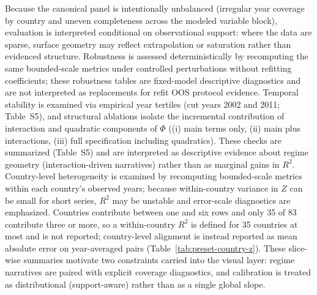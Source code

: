 \documentclass[11pt]{article}
\begin{document}
Because the canonical panel is intentionally unbalanced (irregular year coverage by country and uneven completeness across the modeled variable block), evaluation is interpreted conditional on observational support: where the data are sparse, surface geometry may reflect extrapolation or saturation rather than evidenced structure. Robustness is assessed deterministically by recomputing the same bounded-scale metrics under controlled perturbations without refitting coefficients; these robustness tables are fixed-model descriptive diagnostics and are not interpreted as replacements for refit OOS protocol evidence. Temporal stability is examined via empirical year tertiles (cut years 2002 and 2011; Table~S5), and structural ablations isolate the incremental contribution of interaction and quadratic components of $\Phi$ ((i) main terms only, (ii) main plus interactions, (iii) full specification including quadratics). These checks are summarized (Table~S5) and are interpreted as descriptive evidence about regime geometry (interaction-driven narratives) rather than as marginal gains in $R^2$. Country-level heterogeneity is examined by recomputing bounded-scale metrics within each country’s observed years; because within-country variance in $Z$ can be small for short series, $R^2$ may be unstable and error-scale diagnostics are emphasized. Countries contribute between one and six rows and only 35 of 83 contribute three or more, so a within-country $R^2$ is defined for 35 countries at most and is not reported; country-level alignment is instead reported as mean absolute error on year-averaged pairs (Table~\ref{tab:preset-country-z}). These slice-wise summaries motivate two constraints carried into the visual layer: regime narratives are paired with explicit coverage diagnostics, and calibration is treated as distributional (support-aware) rather than as a single global slope.
\end{document}
